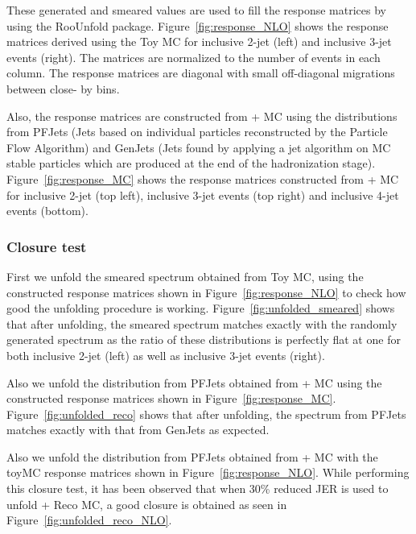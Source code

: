 These generated and smeared values are used to fill the response matrices by using the RooUnfold package. Figure~\ref{fig:response_NLO} 
shows the response matrices derived using the Toy MC for inclusive 2-jet (left) and inclusive 3-jet events (right). The matrices 
are normalized to the number of events in each column. The response matrices are diagonal with small off-diagonal migrations between close-
by \httwo bins.

Also, the response matrices are constructed from \MadGraphF + \PYTHIAS MC using the distributions from PFJets (Jets based on individual 
particles reconstructed by the Particle Flow Algorithm) and GenJets (Jets found by applying a jet algorithm on MC stable particles which are
produced at the end of the hadronization stage). Figure~\ref{fig:response_MC} shows the response matrices constructed from \MadGraphF + 
\PYTHIAS MC for inclusive 2-jet (top left), inclusive 3-jet events (top right) and inclusive 4-jet events (bottom).

\subsubsection{Closure test}
First we unfold the smeared spectrum obtained from Toy MC, using the constructed response matrices shown in Figure~\ref{fig:response_NLO} 
to check how good the unfolding procedure is working. Figure~\ref{fig:unfolded_smeared} shows that after unfolding, the smeared spectrum 
matches exactly with the randomly generated spectrum as the ratio of these distributions is perfectly flat at one for both inclusive 2-jet 
(left) as well as inclusive 3-jet events (right).

Also we unfold the distribution from PFJets obtained from \MadGraphF + \PYTHIAS MC using the constructed response matrices shown in 
Figure~\ref{fig:response_MC}. Figure~\ref{fig:unfolded_reco} shows that after unfolding, the spectrum from PFJets matches exactly with that 
from GenJets as expected.

Also we unfold the distribution from PFJets obtained from \MadGraphF + \PYTHIAS MC with the toyMC response matrices shown in 
Figure~\ref{fig:response_NLO}. While performing this closure test, it has been observed that when 30\% reduced JER is used to unfold \MadGraphF + \PYTHIAS Reco MC, a good closure is obtained as seen in  Figure~\ref{fig:unfolded_reco_NLO}.

